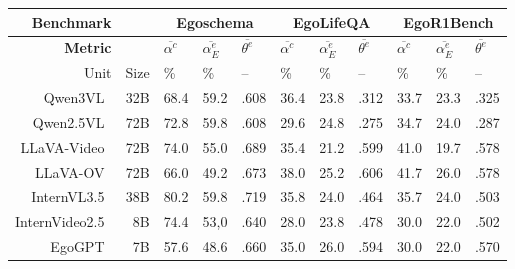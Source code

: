 \begin{table}[htbp]
    \centering
    \fontsize{7}{10}\selectfont
    \setlength{\tabcolsep}{6pt} %
    \renewcommand{\arraystretch}{1.4} %
    \centering
    \begin{tabular}{r|r|p{0.4cm}<{\centering}p{0.4cm}<{\centering}p{0.5cm}<{\centering}|p{0.4cm}<{\centering}p{0.4cm}<{\centering}p{0.5cm}<{\centering}|p{0.4cm}<{\centering}p{0.4cm}<{\centering}p{0.5cm}<{\centering}}
        \textbf{Benchmark} & &
            \multicolumn{3}{c|}{\fontsize{10}{12}\selectfont Egoschema} &
            \multicolumn{3}{c|}{\fontsize{10}{12}\selectfont EgoLifeQA} &
            \multicolumn{3}{c}{\fontsize{10}{12}\selectfont EgoR1Bench}\\ \hline \hline
        \textbf{Metric} & 
        & $\overline{\alpha^c}$ & $\overline{\alpha^e_E}$ & $\overline{\theta^e}$
        & $\overline{\alpha^c}$ & $\overline{\alpha^e_E}$ & $\overline{\theta^e}$
        & $\overline{\alpha^c}$ & $\overline{\alpha^e_E}$ & $\overline{\theta^e}$ \\
        Unit & Size
        & \% & \% & --
        & \% & \% & --
        & \% & \% & -- \\ \hline
        Qwen3VL~\cite{yang2025Qwen3} & 32B & 68.4        & 59.2        & .608  & 36.4  & 23.8        & .312  & 33.7        & 23.3        & .325 \\
        Qwen2.5VL~\cite{qwen2025Qwen25} & 72B & 72.8        & 59.8        & .608  & 29.6        & 24.8        & .275  & 34.7        & 24.0  & .287 \\
        LLaVA-Video~\cite{zhang2025LLaVAVideo} & 72B & 74.0  & 55.0  & .689  & 35.4        & 21.2        & .599  & 41.0  & 19.7        & .578 \\
        LLaVA-OV~\cite{li2024LLaVAOneVision} & 72B & 66.0  & 49.2        & .673  & 38.0  & 25.2        & .606  & 41.7        & 26.0  & .578 \\
        InternVL3.5~\cite{zhu2025InternVL3} & 38B & 80.2        & 59.8        & .719  & 35.8        & 24.0  & .464  & 35.7        & 24.0  & .503 \\
        InternVideo2.5~\cite{wang2025InternVideo25} & 8B & 74.4        & 53,0  & .640   & 28.0  & 23.8        & .478  & 30.0  & 22.0  & .502 \\
        EgoGPT~\cite{yang2025EgoLife} & 7B & 57.6        & 48.6        & .660   & 35.0  & 26.0  & .594  & 30.0  & 22.0  & .570 \\

\end{tabular}
\end{table}
